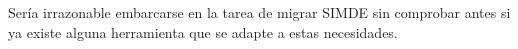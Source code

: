 Sería irrazonable embarcarse en la tarea de migrar SIMDE sin comprobar antes si ya existe alguna
herramienta que se adapte a estas necesidades.